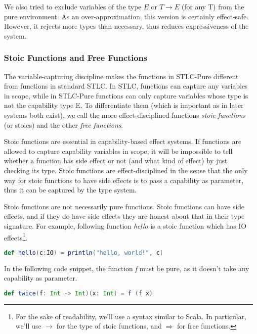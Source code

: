 We also tried to exclude variables of the type $E$ or $T \to E$ (for
any T) from the pure environment. As an over-approximation, this
version is certainly effect-safe. However, it rejects more types than
necessary, thus reduces expressiveness of the system.

\subsubsection{Stoic Functions and Free Functions}

The variable-capturing discipline makes the functions in STLC-Pure
different from functions in standard STLC. In STLC, functions can
capture any variables in scope, while in STLC-Pure functions can only
capture variables whose type is not the capability type E. To
differentiate them (which is important as in later systems both
exist), we call the more effect-disciplined functions \emph{stoic
  functions} (or stoics) and the other \emph{free functions}.

Stoic functions are essential in capability-based effect systems. If
functions are allowed to capture capability variables in scope, it
will be impossible to tell whether a function has side effect or not
(and what kind of effect) by just checking its type. Stoic functions
are effect-disciplined in the sense that the only way for stoic
functions to have side effects is to pass a capability as parameter,
thus it can be captured by the type system.

Stoic functions are not necessarily pure functions. Stoic functions
can have side effects, and if they do have side effects they are
honest about that in their type signature. For example, following
function \emph{hello} is a stoic function which has IO
effects\footnote{For the sake of readability, we'll use a syntax
  similar to Scala. In particular, we'll use $\to$ for the type of
  stoic functions, and $\Rightarrow$ for free functions.}.

\begin{lstlisting}[language=Scala]
  def hello(c:IO) = println("hello, world!", c)
\end{lstlisting}

In the following code snippet, the function \emph{f} must be pure, as
it doesn't take any capability as parameter.

\begin{lstlisting}[language=Scala]
  def twice(f: Int -> Int)(x: Int) = f (f x)
\end{lstlisting}

